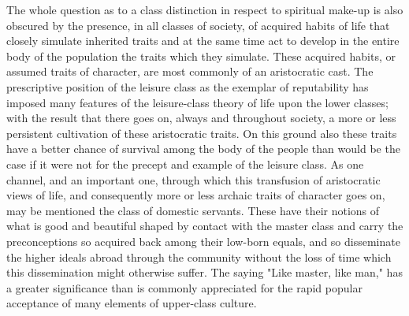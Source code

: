 \documentclass[12pt]{report}
\begin{document}
The whole question as to a class distinction in respect to spiritual
make-up is also obscured by the presence, in all classes of society, of
acquired habits of life that closely simulate inherited traits and at
the same time act to develop in the entire body of the population the
traits which they simulate. These acquired habits, or assumed traits of
character, are most commonly of an aristocratic cast. The prescriptive
position of the leisure class as the exemplar of reputability has
imposed many features of the leisure-class theory of life upon the
lower classes; with the result that there goes on, always and throughout
society, a more or less persistent cultivation of these aristocratic
traits. On this ground also these traits have a better chance of
survival among the body of the people than would be the case if it were
not for the precept and example of the leisure class. As one channel,
and an important one, through which this transfusion of aristocratic
views of life, and consequently more or less archaic traits of character
goes on, may be mentioned the class of domestic servants. These have
their notions of what is good and beautiful shaped by contact with the
master class and carry the preconceptions so acquired back among their
low-born equals, and so disseminate the higher ideals abroad through
the community without the loss of time which this dissemination might
otherwise suffer. The saying "Like master, like man," has a greater
significance than is commonly appreciated for the rapid popular
acceptance of many elements of upper-class culture.
\end{document}

